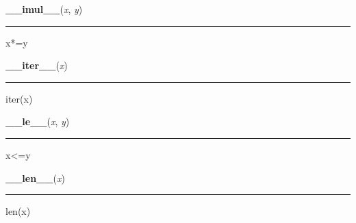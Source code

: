     \begin{boxedminipage}{\textwidth}

    \raggedright \textbf{\_\_imul\_\_}(\textit{x}, \textit{y})

    \vspace{-1.5ex}

    \rule{\textwidth}{0.5\fboxrule}

x*=y
    \vspace{1ex}

    \end{boxedminipage}

    \label{list:__iter__}

    \vspace{0.5ex}

    \begin{boxedminipage}{\textwidth}

    \raggedright \textbf{\_\_iter\_\_}(\textit{x})

    \vspace{-1.5ex}

    \rule{\textwidth}{0.5\fboxrule}

iter(x)
    \vspace{1ex}

    \end{boxedminipage}

    \label{list:__le__}

    \vspace{0.5ex}

    \begin{boxedminipage}{\textwidth}

    \raggedright \textbf{\_\_le\_\_}(\textit{x}, \textit{y})

    \vspace{-1.5ex}

    \rule{\textwidth}{0.5\fboxrule}

x{\textless}=y
    \vspace{1ex}

    \end{boxedminipage}

    \label{list:__len__}

    \vspace{0.5ex}

    \begin{boxedminipage}{\textwidth}

    \raggedright \textbf{\_\_len\_\_}(\textit{x})

    \vspace{-1.5ex}

    \rule{\textwidth}{0.5\fboxrule}

len(x)
    \vspace{1ex}

    \end{boxedminipage}

